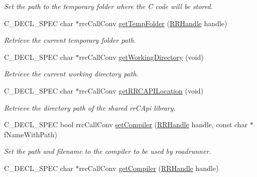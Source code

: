 \begin{DoxyCompactItemize}
\begin{DoxyCompactList}\small\item\em Set the path to the temporary folder where the C code will be stored. \end{DoxyCompactList}\item 
C\+\_\+\+D\+E\+C\+L\+\_\+\+S\+P\+E\+C char $\ast$rrc\+Call\+Conv \hyperlink{group__utility_ga6ee2696295901d265494a18228cfcc4c}{get\+Temp\+Folder} (\hyperlink{rrc__types_8h_a1d68f0592372208fa5a5f2799ea4b3ae}{R\+R\+Handle} handle)
\begin{DoxyCompactList}\small\item\em Retrieve the current temporary folder path. \end{DoxyCompactList}\item 
C\+\_\+\+D\+E\+C\+L\+\_\+\+S\+P\+E\+C char $\ast$rrc\+Call\+Conv \hyperlink{group__utility_gaa589240169c653747f7c702a614489c8}{get\+Working\+Directory} (void)
\begin{DoxyCompactList}\small\item\em Retrieve the current working directory path. \end{DoxyCompactList}\item 
C\+\_\+\+D\+E\+C\+L\+\_\+\+S\+P\+E\+C char $\ast$rrc\+Call\+Conv \hyperlink{group__utility_ga98a4ed176eeff87e87fa4a4acf5240a6}{get\+R\+R\+C\+A\+P\+I\+Location} (void)
\begin{DoxyCompactList}\small\item\em Retrieve the directory path of the shared rr\+C\+Api library. \end{DoxyCompactList}\item 
C\+\_\+\+D\+E\+C\+L\+\_\+\+S\+P\+E\+C bool rrc\+Call\+Conv \hyperlink{group__utility_ga452d753989b5142b29528ae5865224ae}{set\+Compiler} (\hyperlink{rrc__types_8h_a1d68f0592372208fa5a5f2799ea4b3ae}{R\+R\+Handle} handle, const char $\ast$f\+Name\+With\+Path)
\begin{DoxyCompactList}\small\item\em Set the path and filename to the compiler to be used by roadrunner. \end{DoxyCompactList}\item 
\hypertarget{group__utility_gab3490137aa84bb6424ae8ccba0eb135c}{}C\+\_\+\+D\+E\+C\+L\+\_\+\+S\+P\+E\+C char $\ast$rrc\+Call\+Conv \hyperlink{group__utility_gab3490137aa84bb6424ae8ccba0eb135c}{get\+Compiler} (\hyperlink{rrc__types_8h_a1d68f0592372208fa5a5f2799ea4b3ae}{R\+R\+Handle} handle)\label{group__utility_gab3490137aa84bb6424ae8ccba0eb135c}


\end{DoxyCompactItemize}
